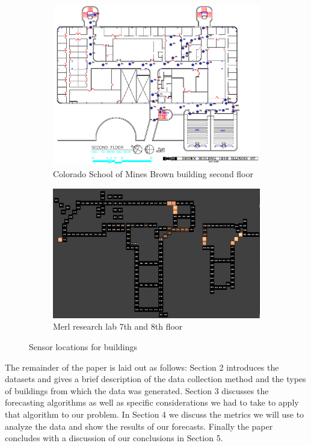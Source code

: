 \documentclass{acm_proc_article-sp}
\begin{document}
\begin{figure}[ht]
\centering
\begin{subfigure}{.45\textwidth}
  \centering
  \includegraphics[width=.8\linewidth]{bb_floor2_sensors_old.png}
  \caption{Colorado School of Mines Brown building second floor}
  \label{fig:sub1}
\end{subfigure}
\begin{subfigure}{.45\textwidth}
  \centering
  \includegraphics[width=.8\linewidth]{merl_map.png}
  \caption{Merl research lab 7th and 8th floor}
  \label{fig:sub2}
\end{subfigure}
\caption{Sensor locations for buildings}
\label{fig:test}
\end{figure}

The remainder of the paper is laid out as follows: Section 2 introduces the datasets and gives a brief description of the data collection method and the types of buildings from which the data was generated.  Section 3 discusses the forecasting algorithms as well as specific considerations we had to take to apply that algorithm to our problem.  In Section 4 we discuss the metrics we will use to analyze the data and show the results of our forecasts.  Finally the paper concludes with a discussion of our conclusions in Section 5.
\end{document}

